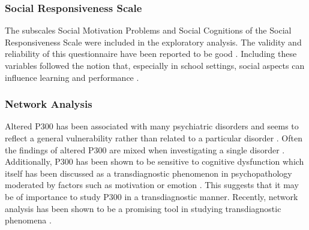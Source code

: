 \subsubsection{Social Responsiveness Scale}
The subscales Social Motivation Problems and Social Cognitions of the Social Responsiveness Scale \parencite{wighamReliabilityValiditySocial2012} were included in the exploratory analysis. The validity and reliability of this questionnaire have been reported to be good \parencite{wighamReliabilityValiditySocial2012}. Including these variables followed the notion that, especially in school settings, social aspects can influence learning and performance \parencite{wentzelAcademicSocialMotivational1998a}.

\subsubsection{Network Analysis}
Altered P300 has been associated with many psychiatric disorders \parencite{polichClinicalApplicationP3002004,surEventrelatedPotentialOverview2009} and seems to reflect a general vulnerability \parencite{surEventrelatedPotentialOverview2009} rather than related to a particular disorder \parencite{duncanEventrelatedPotentialsClinical2009}. Often the findings of altered P300 are mixed when investigating a single disorder \parencite{salgariEventrelatedPotentialsRare2021}. Additionally, P300 has been shown to be sensitive to cognitive dysfunction \parencite{polichCognitiveBiologicalDeterminants1995,potterAssessmentMildHead1999} which itself has been discussed as a transdiagnostic phenomenon in psychopathology moderated by factors such as motivation or emotion \parencite{abramovitchFactorCognitiveDysfunction2021}. This suggests that it may be of importance to study P300 in a transdiagnostic manner. 
Recently, network analysis has been shown to be a promising tool in studying transdiagnostic phenomena \parencite[e.g.,][]{astleAnnualResearchReview2022,borsboomReflectionsEmergingNew2022,chavez-baldiniRelationshipCognitiveFunctioning2021}. 

